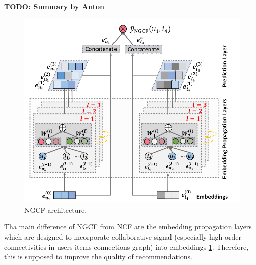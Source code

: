 \textbf{TODO: Summary by Anton}
\begin{figure}[h]
    \centering
    \includegraphics[width=0.8\linewidth]{images/ngcf.png}
    \caption{NGCF architecture.}
    \label{fig:ngcf}
\end{figure}

Tha main difference of NGCF from NCF are the embedding propagation layers which are 
designed to incorporate collaborative signal (especially high-order connectivities 
in users-items connections graph) into embeddings \ref{fig:ngcf}. Therefore, this is supposed to
improve the quality of recommendations.
